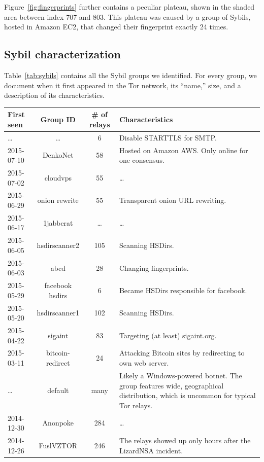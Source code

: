 Figure~\ref{fig:fingerprints} further contains a peculiar plateau, shown in the
shaded area between index 707 and 803.  This plateau was caused by a group of
Sybils, hosted in Amazon EC2, that changed their fingerprint exactly 24 times.

\subsection{Sybil characterization}
\label{sec:sybil_groups}
Table~\ref{tab:sybils} contains all the Sybil groups we identified.  For every
group, we document when it first appeared in the Tor network, its ``name,''
size, and a description of its characteristics.

\begin{table}[t]
\centering
\begin{tabular}{l c c p{10cm}}
\textbf{First seen} & \textbf{Group ID} & \textbf{\# of relays} & \textbf{Characteristics} \\
\hline
\ldots & \ldots & 6 & Disable STARTTLS for SMTP. \\
2015-07-10 & DenkoNet & 58 & Hosted on Amazon AWS.  Only online for one consensus. \\
2015-07-02 & cloudvps & 55 & \ldots \\
2015-06-29 & onion rewrite & 55 & Transparent onion URL rewriting. \\
2015-06-17 & 1jabberat & \ldots & \ldots \\
2015-06-05 & hsdirscanner2 & 105 & Scanning HSDirs. \\
2015-06-03 & abcd & 28 & Changing fingerprints. \\
2015-05-29 & facebook hsdirs & 6 & Became HSDirs responsible for facebook.  \\
2015-05-20 & hsdirscanner1 & 102 & Scanning HSDirs. \\
2015-04-22 & sigaint & 83 & Targeting (at least) sigaint.org. \\
2015-03-11 & bitcoin-redirect & 24 & Attacking Bitcoin sites by redirecting to own web server. \\
\ldots & default & many & Likely a Windows-powered botnet.  The group
features wide, geographical distribution, which is uncommon for typical Tor
relays. \\
2014-12-30 & Anonpoke & 284 & \ldots\\
2014-12-26 & FuslVZTOR & 246 & The relays showed up only hours after the
LizardNSA incident. \\

\end{tabular}
\end{table}
